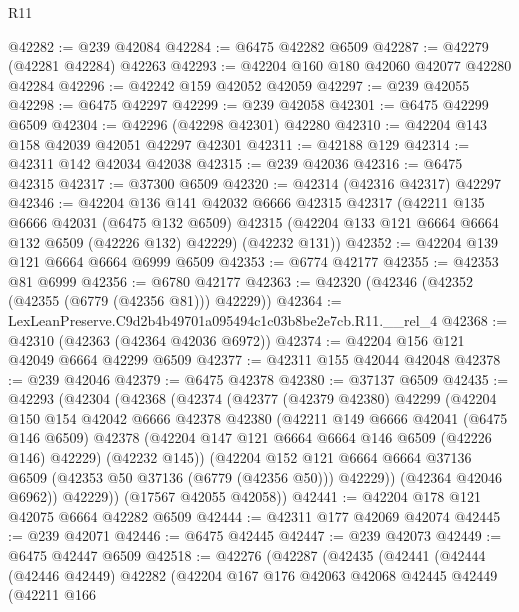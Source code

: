 \begin{lexlean}{R11}
\begin{coremodule}
@42282 := @239 @42084
@42284 := @6475 @42282 @6509
@42287 := @42279 (@42281 @42284) @42263
@42293 := @42204 @160 @180 @42060 @42077 @42280 @42284
@42296 := @42242 @159 @42052 @42059
@42297 := @239 @42055
@42298 := @6475 @42297
@42299 := @239 @42058
@42301 := @6475 @42299 @6509
@42304 := @42296 (@42298 @42301) @42280
@42310 := @42204 @143 @158 @42039 @42051 @42297 @42301
@42311 := @42188 @129
@42314 := @42311 @142 @42034 @42038
@42315 := @239 @42036
@42316 := @6475 @42315
@42317 := @37300 @6509
@42320 := @42314 (@42316 @42317) @42297
@42346 := @42204
    @136
    @141
    @42032
    @6666
    @42315
    @42317
    (@42211
      @135
      @6666
      @42031
      (@6475 @132 @6509)
      @42315
      (@42204 @133 @121 @6664 @6664 @132 @6509 (@42226 @132) @42229)
      (@42232 @131))
@42352 := @42204 @139 @121 @6664 @6664 @6999 @6509
@42353 := @6774 @42177
@42355 := @42353 @81 @6999
@42356 := @6780 @42177
@42363 := @42320 (@42346 (@42352 (@42355 (@6779 (@42356 @81))) @42229))
@42364 := LexLeanPreserve.C9d2b4b49701a095494c1c03b8be2e7cb.R11.__rel_4
@42368 := @42310 (@42363 (@42364 @42036 @6972))
@42374 := @42204 @156 @121 @42049 @6664 @42299 @6509
@42377 := @42311 @155 @42044 @42048
@42378 := @239 @42046
@42379 := @6475 @42378
@42380 := @37137 @6509
@42435 := @42293
    (@42304
      (@42368
        (@42374
          (@42377
            (@42379 @42380)
            @42299
            (@42204
              @150
              @154
              @42042
              @6666
              @42378
              @42380
              (@42211
                @149
                @6666
                @42041
                (@6475 @146 @6509)
                @42378
                (@42204 @147 @121 @6664 @6664 @146 @6509 (@42226 @146) @42229)
                (@42232 @145))
              (@42204
                @152
                @121
                @6664
                @6664
                @37136
                @6509
                (@42353 @50 @37136 (@6779 (@42356 @50)))
                @42229))
            (@42364 @42046 @6962))
          @42229))
      (@17567 @42055 @42058))
@42441 := @42204 @178 @121 @42075 @6664 @42282 @6509
@42444 := @42311 @177 @42069 @42074
@42445 := @239 @42071
@42446 := @6475 @42445
@42447 := @239 @42073
@42449 := @6475 @42447 @6509
@42518 := @42276
    (@42287
      (@42435
        (@42441
          (@42444
            (@42446 @42449)
            @42282
            (@42204
              @167
              @176
              @42063
              @42068
              @42445
              @42449
              (@42211
                @166

\end{coremodule}
\end{lexlean}
